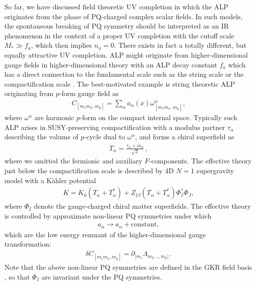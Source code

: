 \documentclass[preprint,prd,aps,tighten,nofootinbib,amssymb]{revtex4}
\newcommand{\bea}{\begin{eqnarray}}
\newcommand{\eea}{\end{eqnarray}}
\def\vpq{f_{a}}
\begin{document}
So far, we have discussed field theoretic UV completion  in which the ALP originates from the phase of PQ-charged complex scalar fields. In such models, the spontaneous breaking of PQ symmetry should be interpreted as an IR phenomenon in the context of a proper  UV completion with the cutoff scale $M_*\gg f_a$, which then  implies $n_u=0$.  
There exists in fact a totally different, but equally attractive UV completion.
ALP might originate from higher-dimensional gauge fields  in higher-dimensional theory   with an ALP decay constant $\vpq$ which has a direct connection to the fundamental scale such as the string scale or the compactification scale  \cite{Svrcek:2006yi,Choi:2003wr,Flacke:2006ad}.
The best-motivated  example is string theoretic ALP originating from $p$-form gauge field  \cite{Svrcek:2006yi} as
\bea
C_{[m_1 m_2 .. m_p]} = \sum_\alpha a_\alpha(x)\omega^\alpha_{[m_1 m_2 .. m_p]},
\eea
where $\omega^\alpha$ are harmonic $p$-form on the compact  internal space. 
Typically such ALP arises in SUSY-preserving compactification  with a modulus partner $\tau_\alpha$ describing the volume of $p$-cycle dual to $\omega^\alpha$, and forms a chiral superfield as 
\bea
T_\alpha =\frac{\tau_\alpha + ia_\alpha}{\sqrt{2}} \, ,
\eea
where we omitted the fermionic and auxiliary $F$-components.
The effective theory just below the compactification scale is described by 4D $N=1$ supergravity model with a K\"ahler potential
\bea
\label{kahler0}
K = K_0(T_\alpha+T^*_\alpha) + Z_{IJ}(T_\alpha+T^*_\alpha)\Phi_I^*\Phi_J,
\eea
where $\Phi_I$ denote the gauge-charged chiral matter superfields.
The effective theory is controlled by approximate non-linear PQ symmetries under which
\bea
a_\alpha\rightarrow a_\alpha +\mbox{constant}, 
\eea
which are the low energy remnant of the higher-dimensional gauge transformation:
\bea
\delta C_{[m_1 m_2 .. m_p]} =\partial_{[m_1}\Lambda_{m_2,..,m_p]}\, .
\eea
Note that the above non-linear PQ symmetries are defined in the GKR field basis \cite{Georgi:1986df}, so that $\Phi_I$ are invariant under the PQ symmetries.
\end{document}
